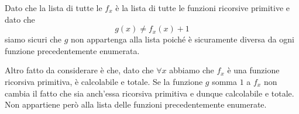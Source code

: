 Dato che la lista di tutte le $f_x$ è la lista di tutte le
funzioni ricorsive primitive e dato che
\[ g(x) \neq f_x (x) + 1 \]
siamo sicuri che $g$ non appartenga alla lista poiché è
sicuramente diversa da ogni funzione precedentemente enumerata.

Altro fatto da considerare è che, dato che $\forall x$ abbiamo
che $f_x$ è una funzione ricorsiva primitiva, è calcolabile e
totale. Se la funzione $g$ somma $1$ a $f_x$ non cambia il fatto
che sia anch'essa ricorsiva primitiva e dunque calcolabile e
totale. Non appartiene però alla lista delle funzioni
precedentemente enumerate.

